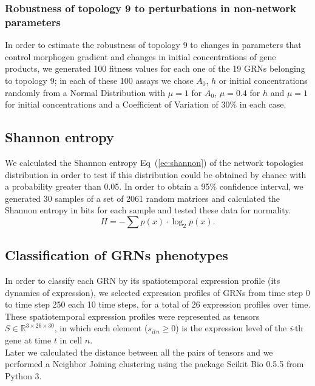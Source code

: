 \documentclass[10pt,letterpaper]{article}
\begin{document}
\subsubsection*{Robustness of topology 9 to perturbations in non-network parameters}

In order to estimate the robustness of topology 9 to changes in parameters that 
control morphogen gradient and changes in initial concentrations of gene 
products, we generated 100 fitness values for each one of the 19 GRNs 
belonging to topology 9; in each of these 100 assays we chose $A_0$, $h$ or 
initial concentrations randomly from a Normal Distribution with $\mu = 1$ for 
$A_0$, $\mu = 0.4$ for $h$ and $\mu = 1$ for initial concentrations and a 
Coefficient of Variation of 30\% in each case.

\subsection*{Shannon entropy}

We calculated the Shannon entropy Eq~(\ref{ec:shannon}) of the network 
topologies distribution in order to test if this distribution could be obtained 
by chance with a probability greater than 0.05. In order to obtain a 95\% 
confidence interval, we generated 30 samples of a set of 2061 random matrices 
and calculated the Shannon entropy in bits for each sample and tested these data
for normality.
\begin{equation}
 H = -\sum p(x) \cdot \log_{2}p(x).
 \label{ec:shannon}
\end{equation}

\subsection*{Classification of GRNs phenotypes}

In order to classify each GRN by its spatiotemporal expression profile (its 
dynamics of expression), we selected expression profiles of GRNs from time step 
0 to time step 250 each 10 time steps, for a total of 26 expression profiles 
over time. These spatiotemporal expression profiles were represented as tensors 
$S \in \mathbb{R}^{3 \times 26 \times 30}$, in which each element ($s_{itn} \geq
0$) is the expression level of the \emph{i}-th gene at time $t$ in cell $n$.\\

Later we calculated the distance between all the pairs of tensors and we 
performed a Neighbor Joining clustering using the package Scikit Bio 0.5.5 from 
Python 3.
\end{document}
